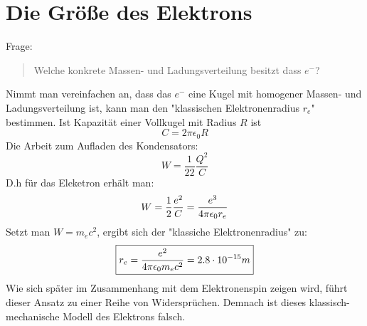 \section{Die Größe des Elektrons} %
\label{sec:Die_Größe_des_Elektrons}
Frage: 
\begin{quote}
    Welche konkrete Massen- und Ladungsverteilung besitzt dass $e^-$?
\end{quote}
Nimmt man vereinfachen an, dass das $e^-$ eine Kugel mit homogener Massen- und
Ladungsverteilung ist, kann man den "klassischen Elektronenradius $r_e$"
bestimmen.
Ist Kapazität einer Vollkugel mit Radius $R$ ist
\begin{equation*}
    C = 2 \pi \epsilon_0 R
\end{equation*}
Die Arbeit zum Aufladen des Kondensators:
\begin{equation*}
    W = \frac{1}{22} \frac{Q^2}{C}
\end{equation*}
D.h für das Eleketron erhält man:
\begin{equation*}
    W = \frac{1}{2} \frac{e^2}{C} = \frac{e^3}{4 \pi \epsilon_0 r_e}
\end{equation*}
Setzt man $W = m_e c^2$, ergibt sich der "klassiche Elektronenradius" zu:
\begin{equation*}
    \boxed{
    r_e = \frac{e^2}{4 \pi \epsilon_0 m_e c^2} = 2.8 \cdot 10^{-15} m
    }
\end{equation*}
Wie sich später im Zusammenhang mit dem Elektronenspin zeigen wird, führt
dieser Ansatz zu einer Reihe von Widersprüchen. Demnach ist dieses
klassisch-mechanische Modell des Elektrons falsch.

